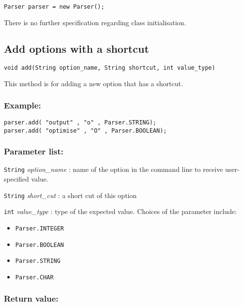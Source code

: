\documentclass{article}
\begin{document}
\begin{lstlisting}
Parser parser = new Parser();
\end{lstlisting}

There is no further specification regarding class initialisation.

\subsection{Add options with a shortcut}

\begin{lstlisting}
void add(String option_name, String shortcut, int value_type)
\end{lstlisting}

This method is for adding a new option that has a shortcut.

\subsubsection*{Example:}
\begin{lstlisting}
parser.add( "output" , "o" , Parser.STRING);
parser.add( "optimise" , "O" , Parser.BOOLEAN);
\end{lstlisting}

\subsubsection*{Parameter list:}

\lstinline{String} \textsl{option\_name} : name of the option in the command line to receive user-specified value.

\lstinline{String} \textsl{short\_cut} : a short cut of this option

\lstinline{int} \textsl{value\_type} : type of the expected value. Choices of the parameter include:

\begin{itemize}
\item \lstinline{Parser.INTEGER}

\item \lstinline{Parser.BOOLEAN}

\item \lstinline{Parser.STRING}

\item \lstinline{Parser.CHAR}
\end{itemize}

\subsubsection*{Return value:}
\end{document}
